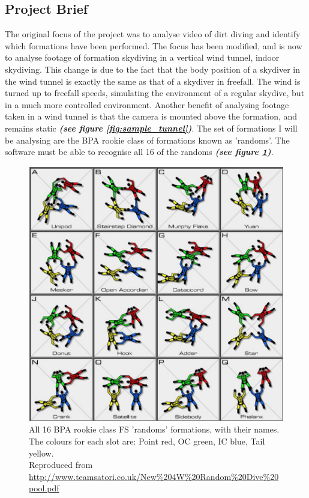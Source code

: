 \documentclass[a4paper, 12pt]{article}
\begin{document}
	\subsection{Project Brief}
The original focus of the project was to analyse video of dirt diving and identify which formations have been performed. The focus has been modified, and is now to analyse footage of formation skydiving in a vertical wind tunnel, indoor skydiving. This change is due to the fact that the body position of a skydiver in the wind tunnel is exactly the same as that of a skydiver in freefall. The wind is turned up to freefall speeds, simulating the environment of a regular skydive, but in a much more controlled environment. Another benefit of analysing footage taken in a wind tunnel is that the camera is mounted above the formation, and remains static \textbf{\emph{(see figure \ref{fig:sample_tunnel})}}. The set of formations I will be analysing are the BPA rookie class of formations known as 'randoms'. The software must be able to recognise all 16 of the randoms \textbf{\emph{(see figure \ref{fig:fs_dive_pool})}}.
%
\begin{figure}[H]
	\centering
	\includegraphics[width=\linewidth]{FS_All.png}
	\caption{All 16 BPA rookie class FS 'randoms' formations, with their names. The colours for each slot are: Point red, OC green, IC blue, Tail yellow.\\
	Reproduced from \url{http://www.teamsatori.co.uk/New\%204W\%20Random\%20Dive\%20pool.pdf}}
	\label{fig:fs_dive_pool}
\end{figure}
\end{document}
